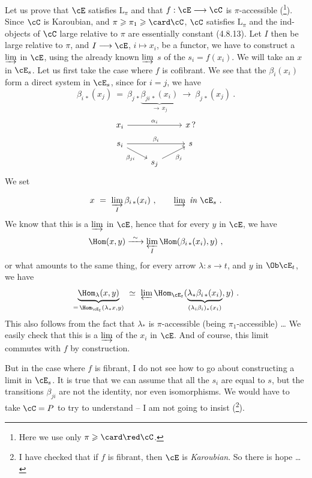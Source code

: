 Let us prove that $\cE$ satisfies $\mathrm{L}_{\pi}$ and that $f : \cE \longrightarrow \cC$ is $\pi$-accessible (\footnote[182]{Here we use only $\pi \geqslant \card \red \cC$.}). Since $\cC$ is Karoubian, and $\pi \geqslant \pi_1 \geqslant \card \cC$, $\cC$ satisfies $\mathrm{L}_{\pi}$ and the ind-objects of $\cC$ large relative to $\pi$ are essentially constant (4.8.13). Let $I$ then be large relative to $\pi$, and $I \longrightarrow \cE$, $i \longmapsto x_i$, be a functor, we have to construct a $\varinjlim$ in $\cE$, using the already known $\varinjlim$ $s$ of the $s_i = f(x_i)$. We will take an $x$ in $\cE_s$. Let us first take the case where $f$ is cofibrant. We see that the $\beta_i(x_i)$ form a direct system in $\cE_s$, since for $i = j$, we have
\[
\beta_{i\,*}(x_j) \ = \ \beta_{j\,*} \underbrace{\beta_{ji\,*}(x_i)}_{\longrightarrow \, x_j} \ \longrightarrow \ \beta_{j\,*}(x_j) \ . %
\]
\[
\begin{tikzcd}[row sep=small]
x_i \arrow[rr, "\alpha_i"] & & x \, ? \\
s_i \arrow[rr, "\beta_i"] \arrow[dr, "\beta_{ji}"'] & & s \\
& s_j \arrow[ur, "\beta_j"'] &
\end{tikzcd}
\]
We set

\[
x \ = \ \varinjlim_{I} \beta_{i\,*}(x_i) \ , \qquad \varinjlim \ \textit{in } \cE_s \ .
\]
We know that this is a $\varinjlim$ in $\cE$, hence that for every $y$ in $\cE$, we have
\[
\Hom(x, y) \xrightarrow{\ \sim\ } \varprojlim_{I} \Hom(\beta_{i\,*}(x_i), y) \ ,
\]
or what amounts to the same thing, for every arrow $\lambda : s \longrightarrow t$, and $y$ in $\Ob \cE_t$, we have
\[
\underbrace{\Hom_{\lambda}(x, y)}_{= \, \Hom_{\cE_t}(\lambda_* x, y)} \ \simeq \ \varprojlim \Hom_{\cE_t}(\underbrace{\lambda_* \beta_{i\,*}(x_i)}_{(\lambda_i \beta_i)_*(x_i)}, y) \ .
\]
This also follows from the fact that $\lambda_*$ is $\pi$-accessible (being $\pi_1$-accessible) \dots{} We easily check that this is a $\varinjlim$ of the $x_i$ in $\cE$. And of course, this limit commutes with $f$ by construction.

But in the case where $f$ is fibrant, I do not see how to go about constructing a limit in $\cE_s$. It is true that we can assume that all the $s_i$ are equal to $s$, but the transitions $\beta_{ji}$ are not the identity, nor even isomorphisms. We would have to take $\cC = P$ to try to understand -- I am not going to insist (\footnote[183]{I have checked that if $f$ is fibrant, then $\cE$ is \textit{Karoubian}. So there is hope \dots}).

